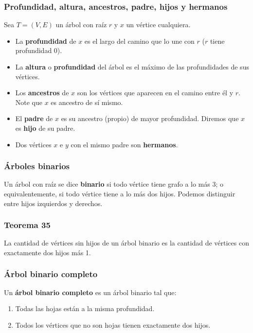 \begin{multicols}{2}
    \subsubsection*{Profundidad, altura, ancestros, padre, hijos y hermanos}
    Sea $T = (V, E)$ un árbol con raíz $r$ y $x$ un vértice cualquiera.
    \begin{itemize}
        \item La \textbf{profundidad} de $x$ es el largo del camino que lo une con $r$ ($r$ tiene profundidad 0).
        \item La \textbf{altura} o \textbf{profundidad} del árbol es el máximo de las profundidades de sus vértices.
        \item Los \textbf{ancestros} de $x$ son los vértices que aparecen en el camino entre él y $r$. Note que $x$ es ancestro de sí mismo.
        \item El \textbf{padre} de $x$ es su ancestro (propio) de mayor profundidad. Diremos que $x$ es \textbf{hijo} de su padre.
        \item Dos vértices $x$ e $y$ con el mismo padre son \textbf{hermanos}.
    \end{itemize}
    
    \subsubsection*{Árboles binarios}
    Un árbol con raíz se dice \textbf{binario} si todo vértice tiene grafo a lo más 3; o equivalentemente, si todo vértice tiene a lo más dos hijos. Podemos distinguir entre hijos izquierdos y derechos.
    
    \subsubsection*{Teorema 35}
    La cantidad de vértices sin hijos de un árbol binario es la cantidad de vértices con exactamente dos hijos más 1.
    
    \subsubsection*{Árbol binario completo}
    Un \textbf{árbol binario completo} es un árbol binario tal que:
    \begin{enumerate}
        \item Todas las hojas están a la misma profundidad.
        \item Todos los vértices que no son hojas tienen exactamente dos hijos.
    \end{enumerate}
    

\end{multicols}
